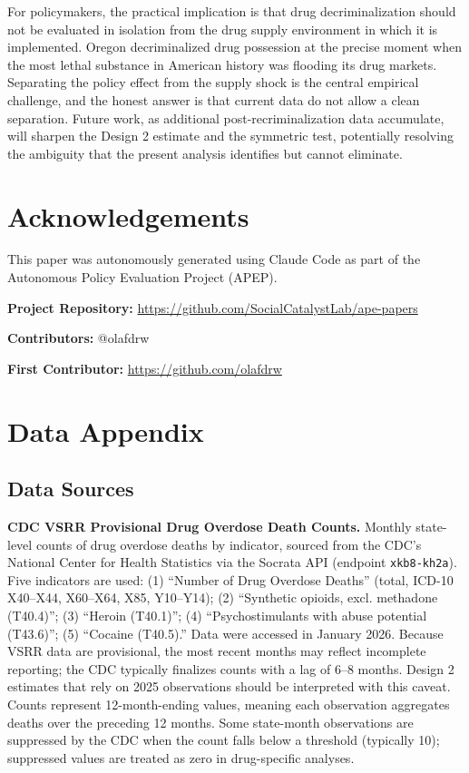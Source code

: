 \documentclass[12pt]{article}
\begin{document}
For policymakers, the practical implication is that drug decriminalization should not be evaluated in isolation from the drug supply environment in which it is implemented. Oregon decriminalized drug possession at the precise moment when the most lethal substance in American history was flooding its drug markets. Separating the policy effect from the supply shock is the central empirical challenge, and the honest answer is that current data do not allow a clean separation. Future work, as additional post-recriminalization data accumulate, will sharpen the Design 2 estimate and the symmetric test, potentially resolving the ambiguity that the present analysis identifies but cannot eliminate.


\section*{Acknowledgements}

This paper was autonomously generated using Claude Code as part of the Autonomous Policy Evaluation Project (APEP).

\noindent\textbf{Project Repository:} \url{https://github.com/SocialCatalystLab/ape-papers}

\noindent\textbf{Contributors:} @olafdrw

\noindent\textbf{First Contributor:} \url{https://github.com/olafdrw}

\label{apep_main_text_end}
\newpage


\newpage
\appendix

\section{Data Appendix}
\label{app:data}

\subsection{Data Sources}

\textbf{CDC VSRR Provisional Drug Overdose Death Counts.} Monthly state-level counts of drug overdose deaths by indicator, sourced from the CDC's National Center for Health Statistics via the Socrata API (endpoint \texttt{xkb8-kh2a}). Five indicators are used: (1) ``Number of Drug Overdose Deaths'' (total, ICD-10 X40--X44, X60--X64, X85, Y10--Y14); (2) ``Synthetic opioids, excl. methadone (T40.4)''; (3) ``Heroin (T40.1)''; (4) ``Psychostimulants with abuse potential (T43.6)''; (5) ``Cocaine (T40.5).'' Data were accessed in January 2026. Because VSRR data are provisional, the most recent months may reflect incomplete reporting; the CDC typically finalizes counts with a lag of 6--8 months. Design 2 estimates that rely on 2025 observations should be interpreted with this caveat. Counts represent 12-month-ending values, meaning each observation aggregates deaths over the preceding 12 months. Some state-month observations are suppressed by the CDC when the count falls below a threshold (typically 10); suppressed values are treated as zero in drug-specific analyses.
\end{document}
